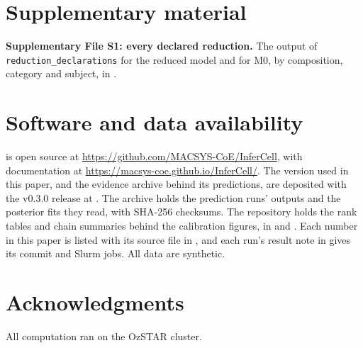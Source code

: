 \section*{Supplementary material}

\textbf{Supplementary File S1: every declared reduction.} The output of \texttt{reduction\_declarations} for the
reduced model and for M0, by composition, category and subject, in
.

\section*{Software and data availability}
\label{sec:availability}

\IC{} is open source at \url{https://github.com/MACSYS-CoE/InferCell}, with
documentation at \url{https://macsys-coe.github.io/InferCell/}. The version used in this paper, and the evidence archive behind
its predictions, are deposited with the v0.3.0 release at . The archive holds the prediction runs' outputs and the posterior fits they read, with SHA-256 checksums. The repository holds the rank tables and chain summaries behind the calibration figures, in  and . Each number in this paper is listed with its source file in
, and each run's result note in  gives its
commit and Slurm jobs. All data are synthetic.

\section*{Acknowledgments}
All computation ran on the OzSTAR cluster. 
